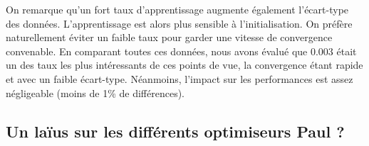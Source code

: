 On remarque qu'un fort taux d'apprentissage augmente également l'écart-type des données. L'apprentissage est alors plus sensible à l'initialisation. On préfère
naturellement éviter un faible taux pour garder une vitesse de convergence convenable. En comparant toutes ces données, nous avons évalué que 0.003 était un des taux 
les plus intéressants de ces points de vue, la convergence étant rapide et avec un faible écart-type. Néanmoins, l'impact sur les performances est assez négligeable
(moins de 1\% de différences).


\subsection{Un laïus sur les différents optimiseurs Paul ?}

















